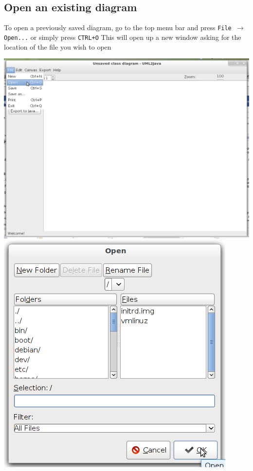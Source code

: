 \documentclass[a4paper]{article}
\begin{document}
\subsection{Open an existing diagram} 
To open a previously saved diagram, go to the top menu bar and press \texttt{File $\rightarrow$ Open...} or simply press \texttt{CTRL+O}
This will open up a new window asking for the location of the file you wish to open
\begin{center} \includegraphics[trim = 0pt 300pt 700pt 0pt, clip, scale=0.4]{./images/file-open1.png}     
\includegraphics[scale=0.4]{./images/file-open2.png} \end{center}
\end{document}
